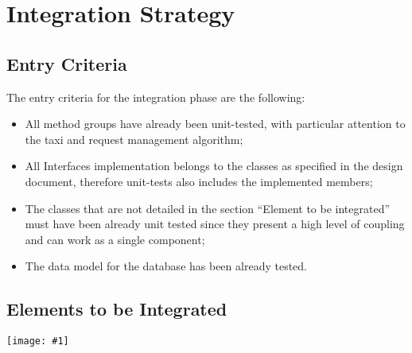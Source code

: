 \documentclass[11pt, a4paper,titlepage]{article}
\newcommand{\image}[1]{
	\begin{center}
		\noindent \texttt{[image: \#1]}
	\end{center}
}
\begin{document}
	\section{Integration Strategy}
	
	\subsection{Entry Criteria}
	The entry criteria for the integration phase are the following:
	\begin{itemize}
		\item All method groups have already been unit-tested, with particular attention to the taxi and request management algorithm;
		\item All Interfaces implementation belongs to the classes as specified in the design document, therefore unit-tests also includes the implemented members;
		\item The classes that are not detailed in the section “Element to be integrated” must have been already unit tested since they present a high level of coupling and can work as a single component;
		\item The data model for the database has been already tested.
	\end{itemize}
	
	\subsection{Elements to be Integrated}
	\image{SystemHierarchy.png}
	\newpage
	
\end{document}
